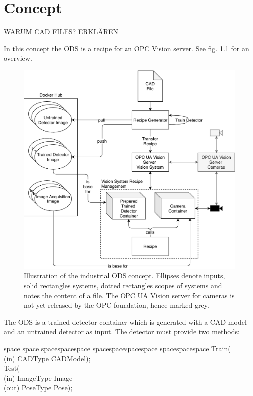 \chapter{Concept\label{cha:chapter4}}
WARUM CAD FILES? ERKLÄREN

In this concept the ODS is a recipe for an OPC Vision server. See fig. \ref{fig:concept} for an overview. 
\begin{figure}
    \centering
    \includegraphics[width=\textwidth]{img/Concept.pdf}
    \caption[Concept]{Illustration of the industrial ODS concept. Ellipses denote inputs, solid rectangles systems, dotted rectangles scopes of systems and notes the content of a file. The OPC UA Vision server for cameras is not yet released by the OPC foundation, hence marked grey.}
    \label{fig:concept}
\end{figure}

The ODS is a trained detector container which is generated with a CAD model and an untrained detector as input. The detector must provide two methods:
\begin{tabbing}
\label{detectormethods}
    space \= space \= spacespacespace \= spacespacespacespace \= spacespacespace \kill
    \>  Train(\\
    \>  \>  (in)	 \> 	CADType          \> CADModel); \\
    \>  Test(\\
    \>  \>  (in)	 \> 	ImageType     \> Image\\
    \>  \>  (out)	 \> 	PoseType           \> Pose); 
\end{tabbing}

